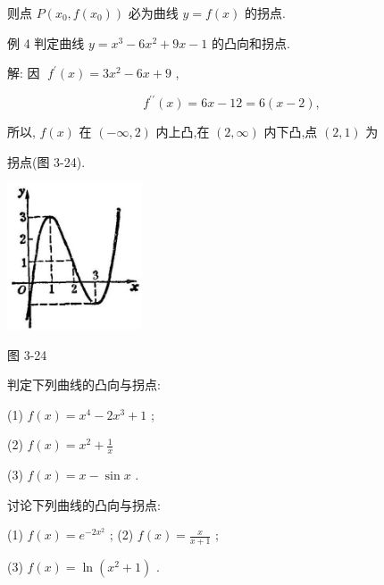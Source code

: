 \documentclass[lang=cn,newtx,10pt,scheme=chinese]{elegantbook}
\begin{document}
则点 \(P\left( {{x}_{0},f\left( {x}_{0}\right) }\right)\) 必为曲线 \(y = f\left( x\right)\) 的拐点.

例 4 判定曲线 \(y = {x}^{3} - 6{x}^{2} + {9x} - 1\) 的凸向和拐点.

解: 因 \(\;{f}^{\prime }\left( x\right) = 3{x}^{2} - {6x} + 9\) ,

\[
{f}^{\prime \prime }\left( x\right) = {6x} - {12} = 6\left( {x - 2}\right) ,
\]

所以, \(f\left( x\right)\) 在 \(\left( {-\infty ,2}\right)\) 内上凸,在 \(\left( {2,\infty }\right)\) 内下凸,点 \(\left( {2,1}\right)\) 为

拐点(图 3-24).

\begin{center}
\includegraphics[max width=0.3\textwidth]{images/01912c18-5c3f-733d-b775-749ba9897a9d_170_742442.jpg}
\end{center}

图 3-24

\begin{center}
\end{center}

\begin{problemset}[练习]

\item 判定下列曲线的凸向与拐点:

(1) \(f\left( x\right) = {x}^{4} - 2{x}^{3} + 1\) ;

(2) \(f\left( x\right) = {x}^{2} + \frac{1}{x}\)

(3) \(f\left( x\right) = x - \sin x\) .

\item 讨论下列曲线的凸向与拐点:

(1) \(f\left( x\right) = {e}^{-2{x}^{2}}\) ; (2) \(f\left( x\right) = \frac{x}{x + 1}\) ;

(3) \(f\left( x\right) = \ln \left( {{x}^{2} + 1}\right)\) .

\end{problemset}
\end{document}
